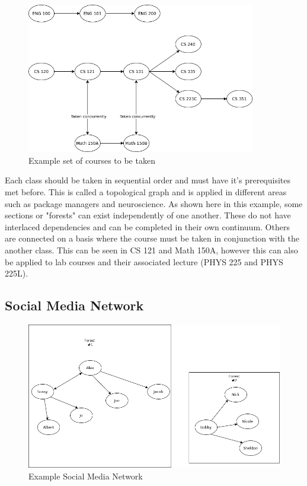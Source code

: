 \documentclass{article}
\begin{document}
\begin{figure}[!h]
\centering
\includegraphics[width=10cm]{CourseRequirements}
\caption{Example set of courses to be taken}
\end{figure}

Each class should be taken in sequential order and must have it's prerequisites met before.
This is called a topological graph and is applied in different areas such as package managers and neuroscience.
As shown here in this example, some sections or "forests" can exist independently of one another.
These do not have interlaced dependencies and can be completed in their own continuum.
Others are connected on a basis where the course  must be taken in conjunction with the another class.
This can be seen in CS 121 and Math 150A, however this can also be applied to lab courses and their associated lecture (PHYS 225 and PHYS 225L).

\newpage

\subsection{Social Media Network}

\begin{figure}[!h]
\centering
\includegraphics[width=13cm]{SocialMediaNetwork}
\caption{Example Social Media Network}
\end{figure}
\end{document}
